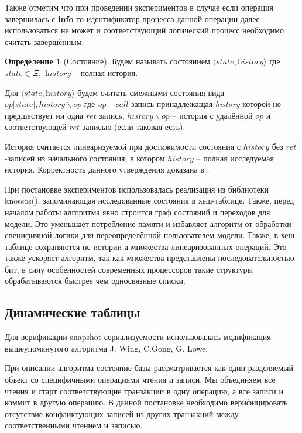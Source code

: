\documentclass[pdftex,ptm,14pt,a4paper]{extreport}
\theoremstyle{definition}
\newtheorem{definition}{Определение}[chapter]
\begin{document}
Также отметим что при проведении экспериментов в случае если операция завершилась с \textbf{info}
то идентификатор процесса данной операции далее использоваться не может и соответствующий
логический процесс необходимо считать завершённым.

\begin{definition}[Состояние]
    Будем называть состоянием $\langle \textit{state}, \textit{history} \rangle$ где
    $\textit{state} \in \Xi,$ $\textit{history}$ -- полная история.
\end{definition}

Для $\langle \textit{state}, \textit{history} \rangle$ будем считать смежными
состояния вида $op\lbrack state\rbrack, history \backslash op$ где
\textit{op} -- $call$ запись принадлежащая \textit{history} которой не предшествует ни одна
$ret$ запись, $history \backslash op$ -- история с удалённой $op$ и соответствующей $ret$-записью
(если таковая есть).

История считается линеаризуемой при достижимости состояния с $history$ без $ret$-записей из начального
состояния, в котором $history$ -- полная исследуемая история. Корректность данного утверждения
доказана в \cite{wing-testing}.

При постановке экспериментов использовалась реализация из библиотеки knossos(\cite{knossos}),
запоминающая исследованные состояния в хеш-таблице. Также, перед началом работы алгоритма явно строится
граф состояний и переходов для модели. Это уменьшает потребление памяти и
избавляет алгоритм от обработки специфичной логики для переопределённой пользователем модели.
Также, в хеш-таблице сохраняются не истории а множества линеаризованных операций. Это также ускоряет
алгоритм, так как множества представлены последовательностью бит, в силу особенностей современных процессоров
такие структуры обрабатываются быстрее чем односвязные списки.

\subsection{Динамические таблицы}
\label{dt-verify}
Для верификации snapshot-сериализуемости использовалась модификация вышеупомянутого алгоритма
J. Wing, C.Gong, G. Lowe.

При описании алгоритма состояние базы рассматривается как один разделяемый объект со специфичными
операциями чтения и записи. Мы объединяем все чтения и старт соответствующие транзакции в
одну операцию, а все записи и коммит в другую операцию. В данной постановке необходимо верифицировать отсутствие конфликтующих
записей из других транзакций между соответственными чтением и записью.
\end{document}
